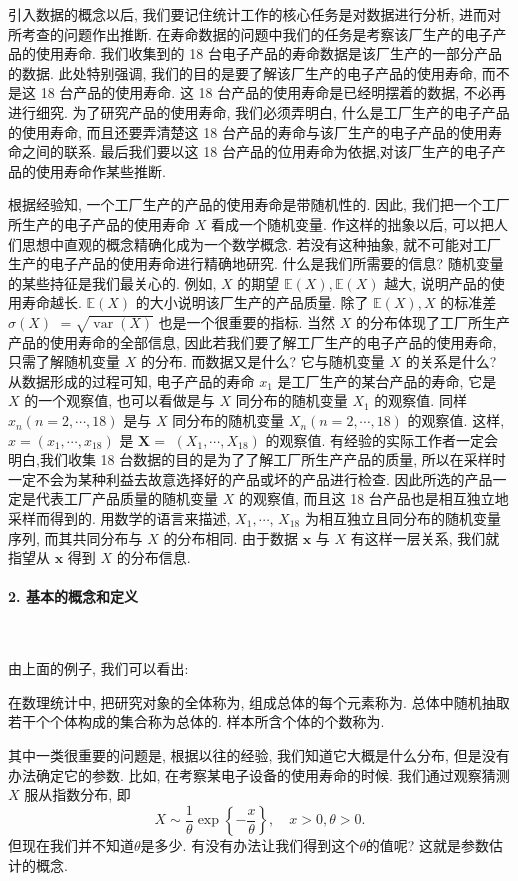 引入数据的概念以后, 我们要记住统计工作的核心任务是对数据进行分析, 进而对所考查的问题作出推断. 在寿命数据的问题中我们的任务是考察该厂生产的电子产品的使用寿命. 我们收集到的 18 台电子产品的寿命数据是该厂生产的一部分产品的数据. 此处特别强调, 我们的目的是要了解该厂生产的电子产品的使用寿命, 而不是这 18 台产品的使用寿命. 这 18 台产品的使用寿命是已经明摆着的数据, 不必再进行细究. 为了研究产品的使用寿命, 我们必须弄明白, 什么是工厂生产的电子产品的使用寿命, 而且还要弄清楚这 18 台产品的寿命与该厂生产的电子产品的使用寿命之间的联系. 最后我们要以这 18 台产品的位用寿命为依据,对该厂生产的电子产品的使用寿命作某些推断. 

根据经验知, 一个工厂生产的产品的使用寿命是带随机性的. 因此, 我们把一个工厂所生产的电子产品的使用寿命 $X$ 看成一个随机变量. 作这样的拙象以后, 可以把人们思想中直观的概念精确化成为一个数学概念. 若没有这种抽象, 就不可能对工厂生产的电子产品的使用寿命进行精确地研究. 什么是我们所需要的信息? 随机变量的某些持征是我们最关心的. 例如, $X$ 的期望 $\mathbb{E}(X), \mathbb{E}(X)$ 越大, 说明产品的使用寿命越长. $\mathbb{E}(X)$ 的大小说明该厂生产的产品质量. 除了 $\mathbb{E}(X), X$ 的标准差 $\sigma(X)$ $=\sqrt{\operatorname{var}(X)}$ 也是一个很重要的指标. 当然 $X$ 的分布体现了工厂所生产产品的使用寿命的全部信息, 因此若我们要了解工厂生产的电子产品的使用寿命, 只需了解随机变量 $X$ 的分布. 而数据又是什么? 它与随机变量 $X$ 的关系是什么? 从数据形成的过程可知, 电子产品的寿命 $x_1$ 是工厂生产的某台产品的寿命, 它是 $X$ 的一个观察值, 也可以看做是与 $X$ 同分布的随机变量 $X_1$ 的观察值. 同样 $x_n(n=2, \cdots, 18)$ 是与 $X$ 同分布的随机变量 $X_n(n=2, \cdots, 18)$ 的观察值. 这样, $x=\left(x_1, \cdots, x_{18}\right)$ 是 $\boldsymbol{X}=$ $\left(X_1, \cdots, X_{18}\right)$ 的观察值. 有经验的实际工作者一定会明白,我们收集 18 台数据的目的是为了了解工厂所生产产品的质量, 所以在采样时一定不会为某种利益去故意选择好的产品或坏的产品进行检查. 因此所选的产品一定是代表工厂产品质量的随机变量 $X$ 的观察值, 而且这 18 台产品也是相互独立地采样而得到的. 用数学的语言来描述, $X_1, \cdots$, $X_{18}$ 为相互独立且同分布的随机变量序列, 而其共同分布与 $X$ 的分布相同. 由于数据 $\boldsymbol{x}$ 与 $X$ 有这样一层关系, 我们就指望从 $\boldsymbol{x}$ 得到 $X$ 的分布信息.

\paragraph{2. 基本的概念和定义}

~

由上面的例子, 我们可以看出: 

\begin{definition}
    在数理统计中, 把研究对象的全体称为, 组成总体的每个元素称为. 总体中随机抽取若干个个体构成的集合称为总体的. 样本所含个体的个数称为. 
\end{definition}

其中一类很重要的问题是, 根据以往的经验, 我们知道它大概是什么分布, 但是没有办法确定它的参数. 比如, 在考察某电子设备的使用寿命的时候. 我们通过观察猜测 $X$ 服从指数分布, 即
$$
X \sim \frac{1}{\theta} \exp \left\{-\frac{x}{\theta}\right\}, \quad x>0, \theta>0 .
$$
但现在我们并不知道$\theta$是多少. 有没有办法让我们得到这个$\theta$的值呢? 这就是参数估计的概念. 